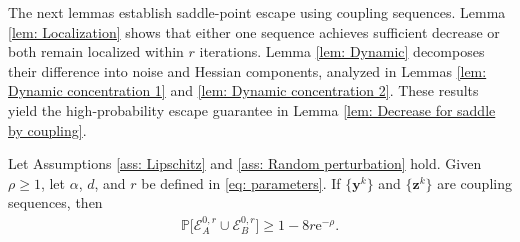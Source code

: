 \documentclass{siamart251216}
\begin{document}
The next lemmas establish saddle-point escape using coupling sequences. Lemma \ref{lem: Localization} shows that either one sequence achieves sufficient decrease or both remain localized within $r$ iterations. Lemma \ref{lem: Dynamic} decomposes their difference into noise and Hessian components, analyzed in Lemmas \ref{lem: Dynamic concentration 1} and \ref{lem: Dynamic concentration 2}. These results yield the high-probability escape guarantee in Lemma \ref{lem: Decrease for saddle by coupling}.

\begin{lemma}
    \label{lem: Localization}
    Let Assumptions \ref{ass: Lipschitz} and \ref{ass: Random perturbation} hold. Given $\rho\geq1$, let $\alpha$, $d$, and $r$ be defined in \eqref{eq: parameters}. If $\{\mathbf{y}^{k}\}$ and $\{\mathbf{z}^{k}\}$ are coupling sequences, then
    \begin{gather}
        \label{eq: Localization}
        \mathbb{P}\Big[\mathcal{E}_{A}^{0,r}\cup\mathcal{E}_{B}^{0,r}\Big]\geq1-8r\mathrm{e}^{-\rho}.
    \end{gather}
\end{lemma}
\end{document}
